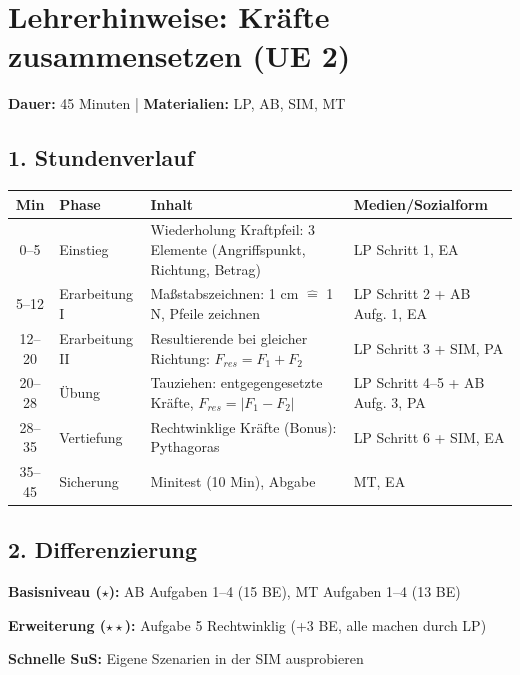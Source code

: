 \documentclass[a4paper,11pt]{article}
\begin{document}
\section*{Lehrerhinweise: Kräfte zusammensetzen (UE 2)}

\textbf{Dauer:} 45 Minuten \quad | \quad \textbf{Materialien:} LP, AB, SIM, MT

\vspace{0.5cm}

\subsection*{1. Stundenverlauf}

\begin{tabular}{|c|p{2.5cm}|p{5cm}|p{4.5cm}|}
\hline
\textbf{Min} & \textbf{Phase} & \textbf{Inhalt} & \textbf{Medien/Sozialform} \\
\hline
0--5 & Einstieg & Wiederholung Kraftpfeil: 3 Elemente (Angriffspunkt, Richtung, Betrag) & LP Schritt 1, EA \\
\hline
5--12 & Erarbeitung I & Maßstabszeichnen: 1 cm $\hat{=}$ 1 N, Pfeile zeichnen & LP Schritt 2 + AB Aufg. 1, EA \\
\hline
12--20 & Erarbeitung II & Resultierende bei gleicher Richtung: $F_{res} = F_1 + F_2$ & LP Schritt 3 + SIM, PA \\
\hline
20--28 & Übung & Tauziehen: entgegengesetzte Kräfte, $F_{res} = |F_1 - F_2|$ & LP Schritt 4--5 + AB Aufg. 3, PA \\
\hline
28--35 & Vertiefung & Rechtwinklige Kräfte (Bonus): Pythagoras & LP Schritt 6 + SIM, EA \\
\hline
35--45 & Sicherung & Minitest (10 Min), Abgabe & MT, EA \\
\hline
\end{tabular}

\vspace{0.5cm}

\subsection*{2. Differenzierung}

\begin{tcolorbox}[colback=lightgray,colframe=physik,boxrule=1pt,arc=0pt]
\textbf{Basisniveau ($\star$):} AB Aufgaben 1--4 (15 BE), MT Aufgaben 1--4 (13 BE)

\textbf{Erweiterung ($\star\star$):} Aufgabe 5 Rechtwinklig (+3 BE, alle machen durch LP)

\textbf{Schnelle SuS:} Eigene Szenarien in der SIM ausprobieren
\end{tcolorbox}
\end{document}
